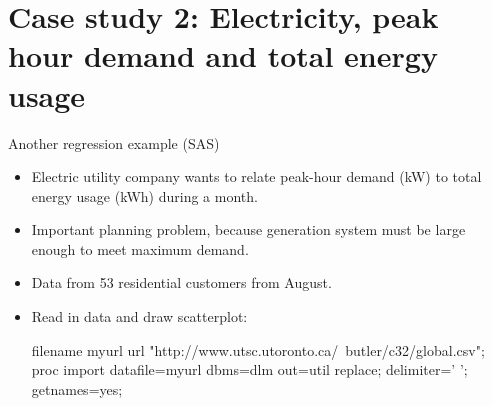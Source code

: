 \documentclass[unknownkeysallowed]{beamer}\usepackage[]{graphicx}\usepackage[]{color}
\begin{document}

\section{Case study 2: Electricity, peak hour demand and total energy
  usage}

\frame{\sectionpage}


\begin{frame}[fragile]{Another regression example (SAS)}

  \begin{itemize}

  \item Electric utility company wants to relate peak-hour demand (kW)
    to total energy usage (kWh) during a month.
  \item Important planning problem, because generation system must be
    large enough to meet maximum demand.
  \item Data from 53 residential customers from August.
  \item Read in data and draw scatterplot:
    \begin{Datastep}
filename myurl url 
  "http://www.utsc.utoronto.ca/~butler/c32/global.csv";
proc import
    datafile=myurl
    dbms=dlm
    out=util
    replace;
    delimiter=' ';
    getnames=yes;
    \end{Datastep}
    

  \end{itemize}
  
\end{frame}
\end{document}

